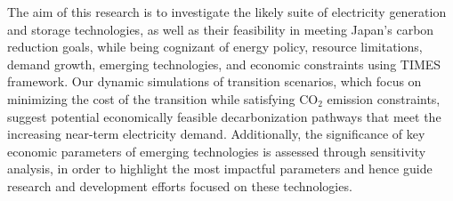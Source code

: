 The aim of this research is to investigate the likely suite of electricity generation and storage technologies, as well as their feasibility in meeting Japan's carbon reduction goals, while being cognizant of energy policy, resource limitations, demand growth, emerging technologies, and economic constraints using \gls{TIMES} framework. Our dynamic simulations of transition scenarios, which focus on minimizing the cost of the transition while satisfying CO$_2$ emission constraints, suggest potential economically feasible decarbonization pathways that meet the increasing near-term electricity demand. Additionally, the significance of key economic parameters of emerging technologies is assessed through sensitivity analysis, in order to highlight the most impactful parameters and hence guide research and development efforts focused on these technologies.
